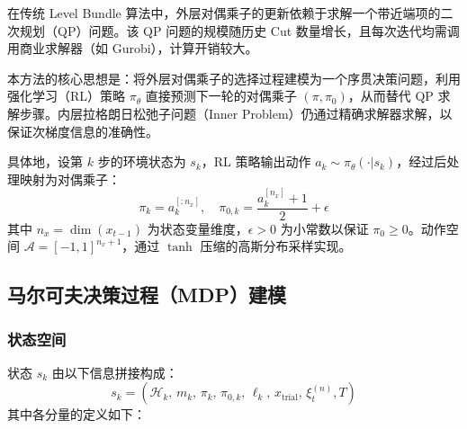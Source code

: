 \documentclass[11pt]{ctexart}
\begin{document}
在传统 Level Bundle 算法中，外层对偶乘子的更新依赖于求解一个带近端项的二次规划（QP）问题。该 QP 问题的规模随历史 Cut 数量增长，且每次迭代均需调用商业求解器（如 Gurobi），计算开销较大。

本方法的核心思想是：将外层对偶乘子的选择过程建模为一个序贯决策问题，利用强化学习（RL）策略 $\pi_\theta$ 直接预测下一轮的对偶乘子 $(\pi, \pi_0)$，从而替代 QP 求解步骤。内层拉格朗日松弛子问题（Inner Problem）仍通过精确求解器求解，以保证次梯度信息的准确性。

具体地，设第 $k$ 步的环境状态为 $s_k$，RL 策略输出动作 $a_k \sim \pi_\theta(\cdot | s_k)$，经过后处理映射为对偶乘子：
\begin{equation}
\pi_k = a_k^{[:n_x]}, \quad \pi_{0,k} = \frac{a_k^{[n_x]} + 1}{2} + \epsilon
\end{equation}
其中 $n_x = \dim(x_{t-1})$ 为状态变量维度，$\epsilon > 0$ 为小常数以保证 $\pi_0 \ge 0$。动作空间 $\mathcal{A} = [-1, 1]^{n_x + 1}$，通过 $\tanh$ 压缩的高斯分布采样实现。

\subsection{马尔可夫决策过程（MDP）建模}

\subsubsection{状态空间}

状态 $s_k$ 由以下信息拼接构成：
\begin{equation}
s_k = \left( \mathcal{H}_k, \, m_k, \, \pi_k, \, \pi_{0,k}, \, \ell_k, \, x_{\text{trial}}, \, \xi_t^{(n)}, T \right)
\end{equation}
其中各分量的定义如下：
\end{document}
